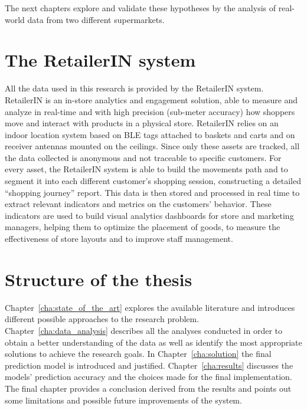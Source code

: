 The next chapters explore and validate these hypotheses by the analysis of real-world data from two different supermarkets.

\section{The RetailerIN system}
\label{sec:retailerin_system}

All the data used in this research is provided by the RetailerIN system. RetailerIN is an in-store analytics and engagement solution, able to measure and analyze in real-time and with high precision (sub-meter accuracy) how shoppers move and interact with products in a physical store. RetailerIN relies on an indoor location system based on BLE tags attached to baskets and carts and on receiver antennas mounted on the ceilings. Since only these assets are tracked, all the data collected is anonymous and not traceable to specific customers. For every asset, the RetailerIN system is able to build the movements path and to segment it into each different customer’s shopping session, constructing a detailed “shopping journey” report. This data is then stored and processed in real time to extract relevant indicators and metrics on the customers’ behavior. These indicators are used to build visual analytics dashboards for store and marketing managers, helping them to optimize the placement of goods, to measure the effectiveness of store layouts and to improve staff management.

\section{Structure of the thesis}
\label{sec:structure_of_the_thesis}

Chapter~\ref{cha:state_of_the_art} explores the available literature and introduces different possible approaches to the research problem. Chapter~\ref{cha:data_analysis} describes all the analyses conducted in order to obtain a better understanding of the data as well as identify the most appropriate solutions to achieve the research goals. In Chapter~\ref{cha:solution} the final prediction model is introduced and justified. Chapter~\ref{cha:results} discusses the models' prediction accuracy and the choices made for the final implementation. The final chapter provides a conclusion derived from the results and points out some limitations and possible future improvements of the system.

\medskip
\clearpage